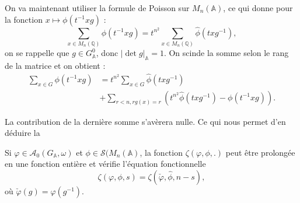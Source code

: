 On va maintenant utiliser la formule de Poisson sur $M_n(\mathbb{A})$, ce qui donne pour la fonction $x \mapsto \phi(t^{-1}xg)$ :
\begin{equation}
\sum_{x \in M_n(\mathbb{Q})} \phi(t^{-1}xg) = t^{n^2}\sum_{x \in M_n(\mathbb{Q})} \hat{\phi}(txg^{-1}),
\end{equation}
on se rappelle que $g \in G^0_\mathbb{A}$, donc $|\det g|_\mathbb{A}=1$. On scinde la somme selon le rang de la matrice et on obtient :
\begin{equation}
\begin{split}
\sum_{x \in G} \phi(t^{-1}xg) &= t^{n^2}\sum_{x \in G} \hat{\phi}(txg^{-1}) \\
&+ \sum_{r < n, rg(x)=r} \left( t^{n^2}\hat{\phi}(txg^{-1}) - \phi(t^{-1}xg)\right).
\end{split}
\end{equation}

La contribution de la dernière somme s'avèrera nulle. Ce qui nous permet d'en déduire la
\begin{proposition}
Si $\varphi \in \mathcal{A}_0(G_\mathbb{A}, \omega)$ et $\phi \in \mathcal{S}(M_n(\mathbb{A})$, la fonction $\zeta(\varphi, \phi, .)$ peut être prolongée en une fonction entière et vérifie l'équation fonctionnelle
\begin{equation}
\label{eqcusp}
\zeta(\varphi, \phi, s) = \zeta(\check{\varphi}, \hat{\phi}, n-s),
\end{equation}
où $\check{\varphi}(g)=\varphi(g^{-1})$.
\end{proposition}

